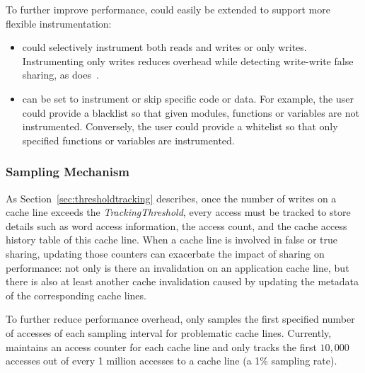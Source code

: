 To further improve performance,
\Predator{} could easily be extended to support more flexible instrumentation:
\begin{itemize}
\item
\Predator{} could selectively instrument both reads and writes or only writes.
Instrumenting only writes reduces overhead while detecting write-write false sharing, 
as \Sheriff{} does~\cite{sheriff}.
\item
\Predator{} can be set to instrument or skip specific code or data. 
For example, the user could provide a blacklist so that given modules,
functions or variables are not instrumented. 
Conversely, the user could provide a whitelist so that only specified functions or variables are instrumented. 
\end{itemize}

\subsubsection{Sampling Mechanism}
\label{sec:sample}
As Section~\ref{sec:thresholdtracking} describes, once the number of
writes on a cache line exceeds the {\it TrackingThreshold}, every
access must be tracked to store details such as word access
information, the access count, and the cache access history table
of this cache line.  When a cache line is involved in false or true
sharing, updating those counters can exacerbate the impact of sharing
on performance: not only is there an invalidation on an application
cache line, but there is also at least another cache invalidation
caused by updating the metadata of the corresponding cache lines.

To further reduce performance overhead, \Predator{} only samples the first specified
number of accesses of each sampling interval for problematic cache lines. 
Currently, \Predator{} maintains an access counter for each cache line
and only tracks the first $10,000$ accesses out of every 1 million
accesses to a cache line (a 1\% sampling rate).

